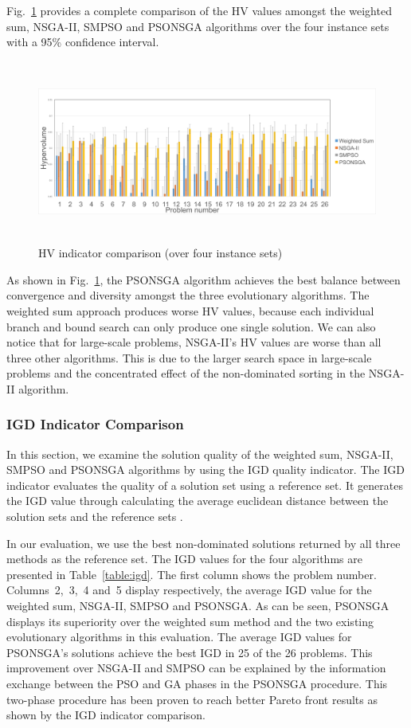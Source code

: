 \documentclass[10pt,journal,compsoc]{IEEEtran}
\newcommand{\Fig}[1]{Fig.~\ref{#1}}
\begin{document}
\Fig{hvaverage} provides a complete comparison of the HV values amongst the weighted sum, NSGA-II, SMPSO and PSONSGA algorithms over the four instance sets with a 95\% confidence interval.
\begin{figure}[ht]
\centerline{\includegraphics[page=1,width=\textwidth, height= 6cm]{hvaverageoverfour.png}}
\caption{HV indicator comparison (over four instance sets)} 
\label{hvaverage}
\end{figure}

As shown in \Fig{hvaverage}, the PSONSGA algorithm achieves the best balance between convergence and diversity amongst the three evolutionary algorithms. The weighted sum approach produces worse HV values, because each individual branch and bound search can only produce one single solution. We can also notice that for large-scale problems, NSGA-II's HV values are worse than all three other algorithms. This is due to the larger search space in large-scale problems and the concentrated effect of the non-dominated sorting in the NSGA-II algorithm.


\subsubsection{IGD Indicator Comparison}
In this section, we examine the solution quality of the weighted sum, NSGA-II, SMPSO and PSONSGA algorithms by using the IGD quality indicator. The IGD indicator evaluates the quality of a solution set using a reference set. It generates the IGD value through calculating the average euclidean distance between the solution sets and the reference sets \cite{gaspar2015evolutionary}. %

In our evaluation, we use the best non-dominated solutions returned by all three methods as the reference set. The IGD values for the four algorithms are presented in Table~\ref{table:igd}. The first column shows the problem number. Columns~2,~3,~4 and~5 display respectively, the average IGD value for the weighted sum, NSGA-II, SMPSO and PSONSGA. As can be seen, PSONSGA displays its superiority over the weighted sum method and the two existing evolutionary algorithms in this evaluation. The average IGD values for PSONSGA's solutions achieve the best IGD in 25 of the 26 problems. This improvement over NSGA-II and SMPSO can be explained by the information exchange between the PSO and GA phases in the PSONSGA procedure. This two-phase procedure has been proven to reach better Pareto front results as shown by the IGD indicator comparison.
\end{document}
